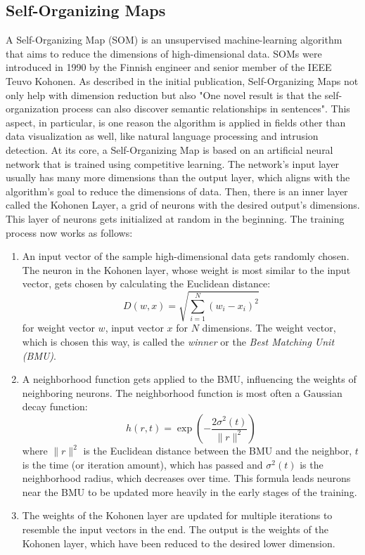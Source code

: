 \documentclass[
    fontsize=12pt,
    headings=small,
    parskip=half,           %
    bibliography=totoc,
    numbers=noenddot,       %
    open=any,               %
    ]{scrreprt}
\begin{document}
\subsection{Self-Organizing Maps}
A Self-Organizing Map (SOM) is an unsupervised machine-learning algorithm that aims to reduce the dimensions of high-dimensional data. SOMs were introduced in 1990 by the Finnish engineer and senior member of the IEEE Teuvo Kohonen. As described in the initial publication, Self-Organizing Maps not only help with dimension reduction but also "One novel result is that the self-organization process can also discover semantic relationships in sentences". This aspect, in particular, is one reason the algorithm is applied in fields other than data visualization as well, like natural language processing and intrusion detection. At its core, a Self-Organizing Map is based on an artificial neural network that is trained using competitive learning. The network's input layer usually has many more dimensions than the output layer, which aligns with the algorithm's goal to reduce the dimensions of data. Then, there is an inner layer called the Kohonen Layer, a grid of neurons with the desired output's dimensions. This layer of neurons gets initialized at random in the beginning. The training process now works as follows:
\begin{enumerate}
	\item An input vector of the sample high-dimensional data gets randomly chosen. The neuron in the Kohonen layer, whose weight is most similar to the input vector, gets chosen by calculating the Euclidean distance: $$D(w, x) = \sqrt{\sum_{i=1}^{N} (w_i - x_i)^2}$$ for weight vector $w$, input vector $x$ for $N$ dimensions. The weight vector, which is chosen this way, is called the \emph{winner} or the \emph{Best Matching Unit (BMU)}.
	\item A neighborhood function gets applied to the BMU, influencing the weights of neighboring neurons. The neighborhood function is most often a Gaussian decay function: $$h(r, t) = \exp\left(-\frac{2\sigma^2(t)}{\|r\|^2}\right)$$ where $\|r\|^2$ is the Euclidean distance between the BMU and the neighbor, $t$ is the time (or iteration amount), which has passed and $\sigma^2(t)$ is the neighborhood radius, which decreases over time. This formula leads neurons near the BMU to be updated more heavily in the early stages of the training.
	\item The weights of the Kohonen layer are updated for multiple iterations to resemble the input vectors in the end. The output is the weights of the Kohonen layer, which have been reduced to the desired lower dimension.
\end{enumerate}
\end{document}
